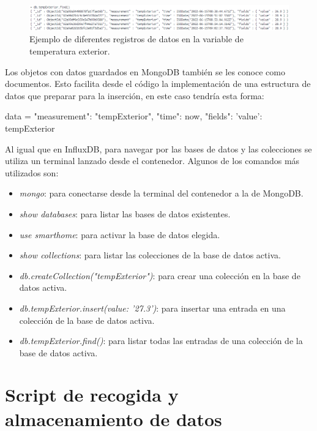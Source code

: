 \begin{figure}[h]
    \centering
    \includegraphics[width=17cm]{imagenes/capitulo4/ejemploMongoDB.png}
    \caption{Ejemplo de diferentes registros de datos en la variable de temperatura exterior.}
    \label{fig:ejemplo_mongodb}
\end{figure}

Los objetos con datos guardados en MongoDB también se les conoce como documentos. Esto facilita desde el código la implementación de una estructura de datos que preparar para la inserción, en este caso tendría esta forma:

\begin{python}
data = {
        "measurement": "tempExterior",
        "time": now,
        "fields": {
            'value': tempExterior
        }
    }
\end{python}

Al igual que en InfluxDB, para navegar por las bases de datos y las colecciones se utiliza un terminal lanzado desde el contenedor. Algunos de los comandos más utilizados son:

\begin{itemize}
    \item \textit{mongo}: para conectarse desde la terminal del contenedor a la de MongoDB.
    \item \textit{show databases}: para listar las bases de datos existentes.
    \item \textit{use smarthome}: para activar la base de datos elegida.
    \item \textit{show collections}: para listar las colecciones de la base de datos activa.
    \item \textit{db.createCollection("tempExterior")}: para crear una colección en la base de datos activa.
    \item \textit{db.tempExterior.insert({value: '27.3'})}: para insertar una entrada en una colección de la base de datos activa.
    \item \textit{db.tempExterior.find()}: para listar todas las entradas de una colección de la base de datos activa.
\end{itemize}

\section{Script de recogida y almacenamiento de datos}

